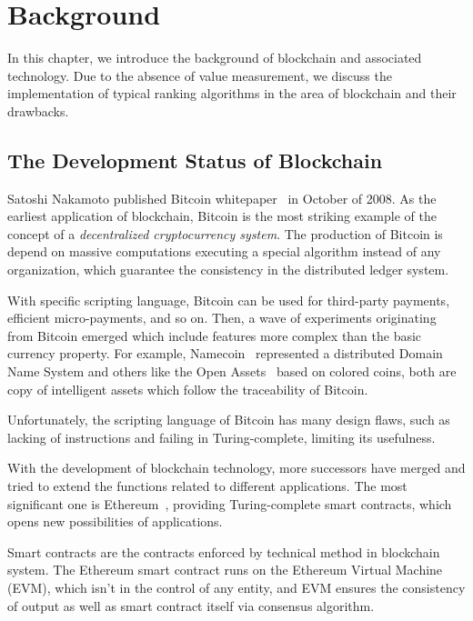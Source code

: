 
\section{Background}
In this chapter, we introduce the background of blockchain and associated technology. Due to the absence of value measurement, we discuss the implementation of typical ranking algorithms in the area of blockchain and their drawbacks.

\subsection{The Development Status of Blockchain}

Satoshi Nakamoto published Bitcoin whitepaper~\cite{Nakamoto2008} in October of 2008. As the earliest application of blockchain, Bitcoin is the most striking example of the  concept of a \emph{decentralized cryptocurrency system}. The production of Bitcoin is depend on massive computations executing a special algorithm instead of any organization, which guarantee the consistency in the distributed ledger system.

With specific scripting language, Bitcoin can be used for third-party payments, efficient micro-payments, and so on. Then, a wave of experiments originating from Bitcoin emerged which include features more complex than the basic currency property. For example, Namecoin~\cite{Namecoin} represented a distributed Domain Name System and others like the Open Assets~\cite{OpenAssets} based on colored coins, both are copy of intelligent assets which follow the traceability of Bitcoin.

Unfortunately, the scripting language of Bitcoin has many design flaws, such as lacking of instructions and failing in Turing-complete, limiting its usefulness.

With the development of blockchain technology, more successors have merged and tried to extend the functions related to different applications. The most significant one is Ethereum~\cite{buterin2013ethereum}, providing Turing-complete smart contracts, which opens new possibilities of applications.

Smart contracts are the contracts enforced by technical method in blockchain system. The Ethereum smart contract runs on the Ethereum Virtual Machine (EVM), which isn't in the control of any entity, and EVM ensures the consistency of output as well as smart contract itself via consensus algorithm.


